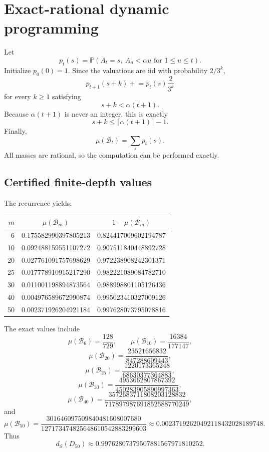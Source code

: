 \documentclass[11pt]{article}
\theoremstyle{definition}
\theoremstyle{remark}
\newcommand{\Sset}{\mathcal S}
\newcommand{\Prob}{\mathbb P}
\newcommand{\ds}{d_{\Sset}}
\begin{document}
\section{Exact-rational dynamic programming}

Let
\[
p_t(s)
=
\Prob\left(A_t=s,\ A_u<\alpha u\text{ for }1\le u\le t\right).
\]
Initialize $p_0(0)=1$.  Since the valuations are iid with probability $2/3^k$,
\begin{equation}
p_{t+1}(s+k)
\mathrel{+}=
p_t(s)\frac{2}{3^k}
\label{eq:DP}
\end{equation}
for every $k\ge1$ satisfying
\[
s+k<\alpha(t+1).
\]
Because $\alpha(t+1)$ is never an integer, this is exactly
\[
s+k\le\lceil\alpha(t+1)\rceil-1.
\]
Finally,
\[
\mu(\mathcal B_t)=\sum_s p_t(s).
\]
All masses are rational, so the computation can be performed exactly.

\subsection{Certified finite-depth values}

The recurrence yields:

\begin{center}
\begin{tabular}{rcc}
\toprule
$m$ & $\mu(\mathcal B_m)$ & $1-\mu(\mathcal B_m)$ \\
\midrule
6  & 0.175582990397805213 & 0.824417009602194787 \\
10 & 0.092488159551107272 & 0.907511840448892728 \\
20 & 0.027761091757698629 & 0.972238908242301371 \\
25 & 0.017778910915217290 & 0.982221089084782710 \\
30 & 0.011001198894873564 & 0.988998801105126436 \\
40 & 0.004976589672990874 & 0.995023410327009126 \\
50 & 0.002371926204921184 & 0.997628073795078816 \\
\bottomrule
\end{tabular}
\end{center}

The exact values include
\[
\mu(\mathcal B_6)=\frac{128}{729},
\qquad
\mu(\mathcal B_{10})=\frac{16384}{177147},
\]
\[
\mu(\mathcal B_{20})
=\frac{23521656832}{847288609443},
\]
\[
\mu(\mathcal B_{25})
=\frac{1220173365248}{68630377364883},
\]
\[
\mu(\mathcal B_{30})
=\frac{4953662807867392}{450283905890997363},
\]
\[
\mu(\mathcal B_{40})
=\frac{3572683711808203128832}{717897987691852588770249},
\]
and
\begin{equation}
\mu(\mathcal B_{50})
=
\frac{301646097509840481608007680}
{127173474825648610542883299603}
\approx0.00237192620492118432028189748.
\label{eq:B50}
\end{equation}
Thus
\[
\ds(D_{50})
\approx0.99762807379507881567971810252.
\]
\end{document}
